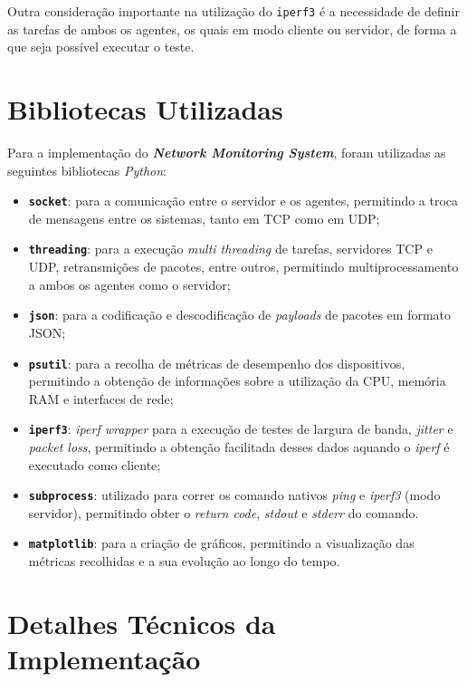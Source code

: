 \documentclass[a4paper,12pt]{scrreprt}
\begin{document}
Outra consideração importante na utilização do \texttt{iperf3} é a necessidade de
definir as tarefas de ambos os agentes, os quais em modo cliente ou servidor,
de forma a que seja possível executar o teste.

\section{Bibliotecas Utilizadas}

Para a implementação do \textbf{\textit{Network Monitoring System}}, foram utilizadas
as seguintes bibliotecas \textit{Python}:

\begin{itemize}
    \item \textbf{\texttt{socket}}: para a comunicação entre o servidor e os agentes,
    permitindo a troca de mensagens entre os sistemas, tanto em TCP como em UDP;
    \item \textbf{\texttt{threading}}: para a execução \textit{multi threading} de tarefas, servidores TCP e UDP,
    retransmições de pacotes, entre outros, permitindo multiprocessamento a ambos os agentes como o servidor;
    \item \textbf{\texttt{json}}: para a codificação e descodificação de \textit{payloads} de pacotes em formato JSON;
    \item \textbf{\texttt{psutil}}: para a recolha de métricas de desempenho dos dispositivos,
    permitindo a obtenção de informações sobre a utilização da CPU, memória RAM e interfaces de rede;
    \item \textbf{\texttt{iperf3}}: \textit{iperf wrapper} para a execução de testes de largura de banda,
    \textit{jitter} e \textit{packet loss}, permitindo a obtenção facilitada desses dados aquando
    o \textit{iperf} é executado como cliente;
    \item \textbf{\texttt{subprocess}}: utilizado para correr os comando nativos \textit{ping} e \textit{iperf3} (modo servidor),
    permitindo obter o \textit{return code}, \textit{stdout} e \textit{stderr} do comando.
    \item \textbf{\texttt{matplotlib}}: para a criação de gráficos, permitindo a visualização
    das métricas recolhidas e a sua evolução ao longo do tempo.
\end{itemize}

\clearpage

\section{Detalhes Técnicos da Implementação}
\end{document}
